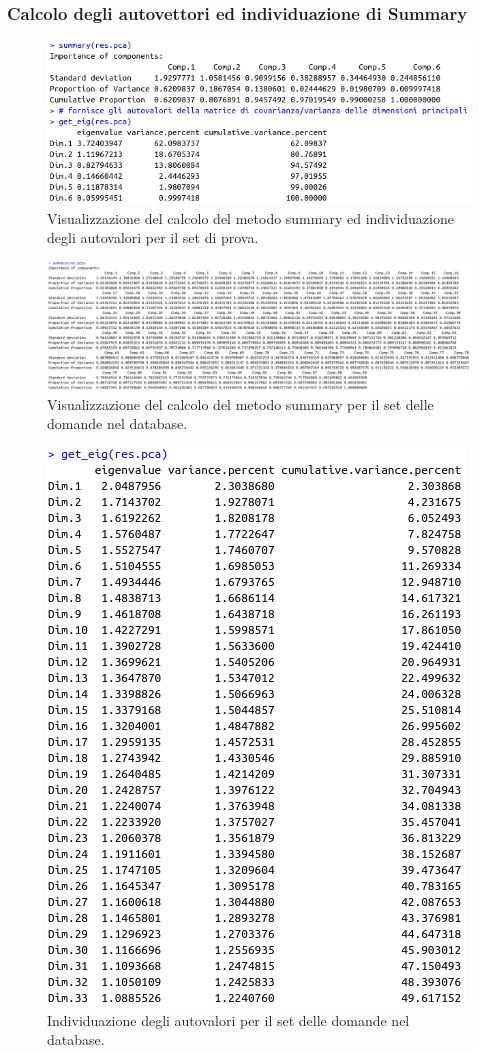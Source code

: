 \subsubsection{Calcolo degli autovettori ed individuazione di Summary}
\label{Calcolo degli autovettori ed individuazione di Summary}
\begin{figure}[H]
\centering
	\includegraphics[width=0.80\linewidth]{../../PCA/plot/summary-autovalore_rete-prova.png}
	\caption{Visualizzazione del calcolo del metodo summary ed individuazione degli autovalori per il set di prova.}
	\label{Visualizzazione del calcolo del metodo summary ed individuazione degli autovalori per il set di prova.}
\end{figure}
\begin{figure}[H]
\centering
	\includegraphics[width=1\linewidth]{../../PCA/plot/summary_db.png}
	\caption{Visualizzazione del calcolo del metodo summary per il set delle domande nel database.}
	\label{Visualizzazione del calcolo del metodo summary per il set delle domande nel database.}
\end{figure}
\begin{figure}[H]
\centering
	\includegraphics[width=0.60\linewidth]{../../PCA/plot/autovalori_db.png}
	\caption{Individuazione degli autovalori per il set delle domande nel database.}
	\label{Individuazione degli autovalori per il set delle domande nel database.}
\end{figure}
